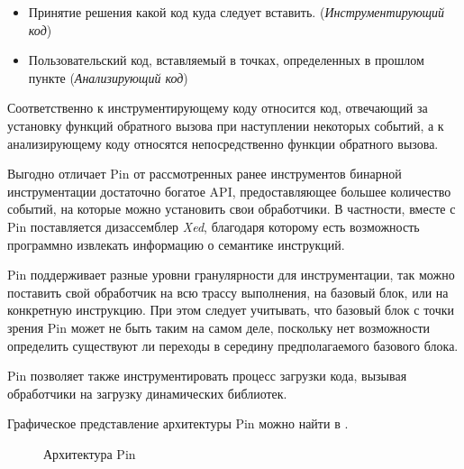 \begin{itemize}
    \item Принятие решения какой код куда следует вставить. (\emph{Инструментирующий код})
    \item Пользовательский код, вставляемый в точках, определенных в прошлом пункте (\emph{Анализирующий код})
\end{itemize}

Соответственно к инструментирующему коду относится код, отвечающий за установку функций обратного вызова при наступлении некоторых событий, а к анализирующему коду относятся непосредственно функции обратного вызова.

Выгодно отличает Pin от рассмотренных ранее инструментов бинарной инструментации достаточно богатое API, предоставляющее большее количество событий, на которые можно установить свои обработчики. В частности, вместе с Pin поставляется дизассемблер \emph{Xed}, благодаря которому есть возможность программно извлекать информацию о семантике инструкций.

Pin поддерживает разные уровни гранулярности для инструментации, так можно поставить свой обработчик на всю трассу выполнения, на базовый блок, или на конкретную инструкцию. При этом следует учитывать, что базовый блок с точки зрения Pin может не быть таким на самом деле, поскольку нет возможности определить существуют ли переходы в середину предполагаемого базового блока.

Pin позволяет также инструментировать процесс загрузки кода, вызывая обработчики на загрузку динамических библиотек.

Графическое представление архитектуры Pin можно найти в \cite{PIN}.
\begin{figure}[H]
    \caption{Архитектура Pin}
    \label{fig:pin}
\end{figure}



